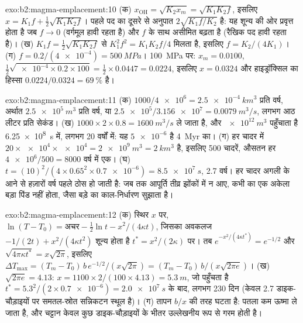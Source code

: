 \begin{solution}{exo:b2:magma-emplacement:10}
(क) $x_{\mathrm{OH}} = \sqrt{K_2x_m} = \sqrt{K_1K_2f}$, इसलिए $x = K_1f + \frac12\sqrt{K_1K_2f}$।
पहले पद का दूसरे से अनुपात $2\sqrt{K_1f/K_2}$ है: यह शून्य की ओर प्रवृत्त होता है
जब $f \to 0$ (वर्गमूल हावी रहता है) और $f$ के साथ असीमित बढ़ता है
(रैखिक पद हावी रहता है)। (ख) $K_1 f = \frac12\sqrt{K_1K_2 f}$ से $K_1^2f^2 =
K_1K_2f/4$ मिलता है, इसलिए $f = K_2/(4K_1)$। (ग) $f = 0.2/(\num{4e-4}) = \qty{500}{MPa}$।
\qty{100}{MPa} पर: $x_m = 0.0100$, $\frac12\sqrt{\num{e-4}\times0.2\times100} =
\frac12\times0.0447 = 0.0224$, इसलिए $x = 0.0324$ और हाइड्रॉक्सिल का हिस्सा
$0.0224/0.0324 = \qty{69}{\percent}$ है।
\end{solution}

\begin{solution}{exo:b2:magma-emplacement:11}
(क) $1000/\num{4e6} = \qty{2.5e-4}{km^3}$ प्रति वर्ष, अर्थात $\qty{2.5e5}{m^3}$ प्रति वर्ष,
या $\num{2.5e5}/\num{3.156e7} = \qty{0.0079}{m^3/s}$, लगभग आठ लीटर प्रति सेकंड।
(ख)  $1000\times2\times0.8 = \qty{1600}{m^3/s}$ ले जाता है, और
$\qty{e12}{m^3}$ पहुँचाता है \qty{6.25e8}{s} में, लगभग 20 वर्षों में: यह $\num{5e-6}$ है
\qty{4}{Myr} का। (ग) हर चादर में $20\times\num{e4}\times\num{e4} = \qty{2e9}{m^3} =
\qty{2}{km^3}$ है, इसलिए 500 चादरें, औसतन हर $\num{4e6}/500 = 8000$ वर्ष में एक।
(घ) $t = (10)^2/(4\times0.65^2\times\num{0.7e-6}) = \qty{8.5e7}{s}$, 2.7 वर्ष। हर
चादर अगली के आने से हज़ारों वर्ष पहले ठोस हो जाती है: जब तक आपूर्ति
तीव्र झोंकों में न आए,  कभी  का एक अकेला बड़ा पिंड नहीं होता, जैसा
बड़े  का काल-निर्धारण सुझाता है।
\end{solution}

\begin{solution}{exo:b2:magma-emplacement:12}
(क) स्थिर $x$ पर, $\ln(T - T_0) = \text{अचर} - \frac12\ln t - x^2/(4\kappa t)$, जिसका
अवकलज $-1/(2t) + x^2/(4\kappa t^2)$ शून्य होता है $t^* = x^2/(2\kappa)$ पर। तब
$e^{-x^2/(4\kappa t^*)} = e^{-1/2}$ और $\sqrt{4\pi\kappa t^*} = x\sqrt{2\pi}$, इसलिए $\Delta
T_{\max} = (T_m - T_0)\,b\,e^{-1/2}/(x\sqrt{2\pi}) = (T_m - T_0)\,b/(x\sqrt{2\pi e})$। (ख)
$\sqrt{2\pi e} = 4.13$: $x = 1100\times2/(100\times4.13) = \qty{5.3}{m}$, जो पहुँचता है
$t^* = 5.3^2/(2\times\num{0.7e-6}) = \qty{2.0e7}{s}$ के बाद, लगभग 230 दिन (केवल 2.7
डाइक-चौड़ाइयों पर समतल-स्रोत सन्निकटन स्थूल है)। (ग) तापन $b/x$ की तरह
घटता है: पतला  कम ऊष्मा ले जाता है, और चट्टान केवल कुछ डाइक-चौड़ाइयों के भीतर
उल्लेखनीय रूप से गरम होती है।
\end{solution}

